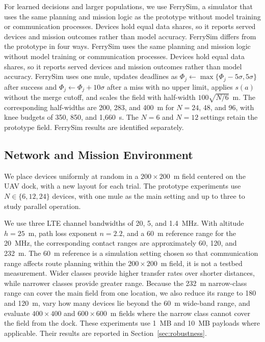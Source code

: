 \documentclass[conference]{IEEEtran}
\begin{document}
For learned decisions and larger populations, we use FerrySim, a simulator that
uses the same planning and mission logic as the prototype without model
training or communication processes. Devices hold equal data shares,
so it reports served devices and mission outcomes rather than model
accuracy. FerrySim differs from the prototype in four ways. FerrySim uses the same planning and mission logic without model training or
communication processes. Devices hold equal data shares, so it reports served
devices and mission outcomes rather than model accuracy. FerrySim uses one mule,
updates deadlines as
$\Phi_j\leftarrow\max\{\Phi_j-5\sigma,5\sigma\}$ after success and
$\Phi_j\leftarrow\Phi_j+10\sigma$ after a miss with no upper limit, applies $s(a)$ without the
merge cutoff, and scales the field with half-width $100\sqrt{N/6}$~m. The corresponding
half-widths are 200, 283, and 400~m for $N=24$, 48, and 96, with knee budgets
of 350, 850, and 1,660~s. The $N=6$ and $N=12$ settings retain the prototype
field. FerrySim results are identified separately.


\subsection{Network and Mission Environment}
\label{sec:environment}

We place devices uniformly at random in a \(200\times200\)~m field centered on
the UAV dock, with a new layout for each trial. The prototype experiments
use \(N\in\{6,12,24\}\) devices, with one mule as the main setting and up to three to study
parallel operation.



We use three LTE channel bandwidths of 20, 5, and 1.4~MHz. With altitude
\(h=25\)~m, path loss exponent \(n=2.2\), and a 60~m reference range for the
20~MHz, the corresponding contact ranges are approximately 60, 120, and
232~m. The 60~m reference is a simulation setting chosen so that communication
range affects route planning within the \(200\times200\)~m field, it is not a
testbed measurement. Wider classes provide higher transfer rates over shorter
distances, while narrower classes provide greater range. Because the 232~m narrow-class range can cover the main field from one
location, we also
reduce its range to 180 and 120~m, vary how many devices lie beyond the 60~m
wide-band range, and evaluate \(400\times400\) and \(600\times600\)~m fields
where the narrow class cannot cover the field from the dock. These experiments
use 1~MB and 10~MB payloads where applicable. Their results are reported in
Section~\ref{sec:robustness}.
\end{document}
